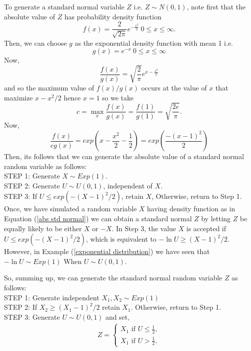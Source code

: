 \begin{example}
    \label{generate normal}
    To generate a standard normal variable $Z$ i.e. $Z\sim N(0,1)$, note first that the absolute value of  $Z$ has probability density function
    \begin{equation}
        \label{abs std normal}
        f(x) = \frac{2}{\sqrt{2\pi}}e^{- \frac{x^{2}}{2}} \ 0\le x \le \infty.
    \end{equation}
    Then, we can choose $g$ as the exponential density function with mean 1 i.e. 
     \[
    g(x) = e^{-x}\ 0\le x\le \infty
    \] 
    Now, 
    \[
        \frac{f(x)}{g(x)} = \sqrt{\frac{2}{\pi}} e^{x-\frac{x^{2}}{2}}
    \] 
    and so the maximum value of $f(x)/g(x)$ occurs at the value of $x$ that maximize $x-x^2 /2$ hence $x=1$ so we take 
    \[
        c = \max_x \frac{f(x)}{g(x)} = \frac{f(1)}{g(1)} = \sqrt{\frac{2e}{\pi}}. 
    \] 
    Now, 
    \[
    \frac{f(x)}{cg(x)} = exp\left( x-\frac{x^2}{2}-\frac{1}{2} \right) = exp\left( \frac{-(x-1)^2}{2} \right)
    \] 
    Then, its follows that we can generate the absolute value of a standard normal random variable as follows: \\
    STEP 1: Generate $X\sim Exp(1)$. \\
    STEP 2: Generate $U\sim U(0,1)$, independent of $X$.\\ 
    STEP 3: If  $U\le exp\left( -(X-1)^2 /2 \right)$, retain  $X$, Otherwise, return to Step 1.\\
    
    Once, we have simulated a random variable $X$ having density function as in 
    Equation (\ref{abs std normal}) we can obtain a standard normal $Z$ by letting
    $Z$ be equally likely to be either  $X$ or  $-X$.
    In Step 3, the value $X$ is accepted if  $U\le exp\left( -(X-1)^2 /2 \right)$, which is equivalent to $- \ln U\ge (X-1)^2 /2$.
However, in Example (\ref{exponential distribution}) we have seen that $-\ln{U}\sim Exp(1)$ When $U\sim U(0,1)$.

So, summing up, we can generate the standard normal random variable $Z$ as follows:\\
STEP 1: Generate independent $X_1, X_2\sim Exp(1) $\\ 
STEP 2: If $X_2\ge (X_1-1)^2 /2$ retain $X_1$. Otherwise, return to Step 1.\\ 
STEP 3: Generate $U\sim U(0,1)$ and set, 
\begin{eqnarray*}
    Z=
    \begin{cases}
        X_1 \text{ if } U\le \frac{1}{2},\\ 
        X_1 \text{ if } U> \frac{1}{2}.
    \end{cases}
\end{eqnarray*}


\end{example}
